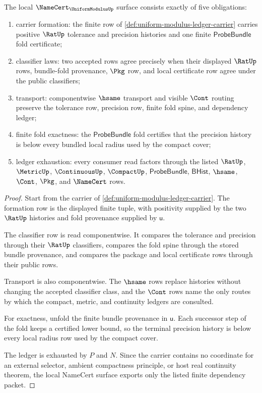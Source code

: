 \begin{theorem}
\label{thm:uniform-modulus-namecert-obligations}
The local $\NameCert_{\UniformModulusUp}$ surface consists exactly of five
obligations:
\begin{enumerate}
\item carrier formation: the finite row of
\autoref{def:uniform-modulus-ledger-carrier} carries positive $\RatUp$
tolerance and precision histories and one finite $\mathsf{ProbeBundle}$ fold
certificate;
\item classifier laws: two accepted rows agree precisely when their displayed
$\RatUp$ rows, bundle-fold provenance, $\Pkg$ row, and local certificate row
agree under the public classifiers;
\item transport: componentwise $\hsame$ transport and visible $\Cont$ routing
preserve the tolerance row, precision row, finite fold spine, and dependency
ledger;
\item finite fold exactness: the $\mathsf{ProbeBundle}$ fold certifies that the
precision history is below every bundled local radius used by the compact cover;
\item ledger exhaustion: every consumer read factors through the listed
$\RatUp$, $\MetricUp$, $\ContinuousUp$, $\CompactUp$, $\mathsf{ProbeBundle}$,
$\mathsf{BHist}$, $\hsame$, $\Cont$, $\Pkg$, and $\NameCert$ rows.
\end{enumerate}
\end{theorem}
\begin{proof}
Start from the carrier of
\autoref{def:uniform-modulus-ledger-carrier}. The formation row is the displayed
finite tuple, with positivity supplied by the two $\RatUp$ histories and fold
provenance supplied by $\mathsf{u}$.

The classifier row is read componentwise. It compares the tolerance and
precision through their $\RatUp$ classifiers, compares the fold spine through
the stored bundle provenance, and compares the package and local certificate
rows through their public rows.

Transport is also componentwise. The $\hsame$ rows replace histories without
changing the accepted classifier class, and the $\Cont$ rows name the only
routes by which the compact, metric, and continuity ledgers are consulted.

For exactness, unfold the finite bundle provenance in $\mathsf{u}$. Each
successor step of the fold keeps a certified lower bound, so the terminal
precision history is below every local radius row used by the compact cover.

The ledger is exhausted by $P$ and $N$. Since the carrier contains no coordinate
for an external selector, ambient compactness principle, or host real
continuity theorem, the local NameCert surface exports only the listed finite
dependency packet.
\end{proof}

